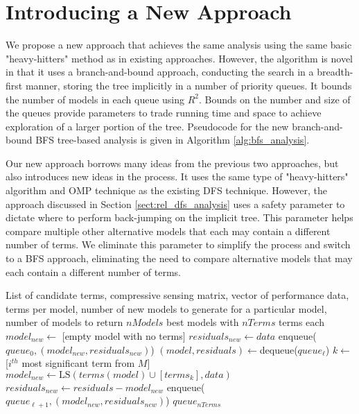 \section{Introducing a New Approach} \label{sect:approach}

We propose a new approach that achieves the same analysis using the same basic "heavy-hitters" method as in existing approaches.
However, the algorithm is novel in that it uses a branch-and-bound approach, conducting the search in a breadth-first manner, storing the tree implicitly in a number of priority queues.
It bounds the number of models in each queue using $R^2$.
Bounds on the number and size of the queues provide parameters to trade running time and space to achieve exploration of a larger portion of the tree. 
Pseudocode for the new branch-and-bound BFS tree-based analysis is given in Algorithm \ref{alg:bfs_analysis}.

Our new approach borrows many ideas from the previous two approaches, but also introduces new ideas in the process.
It uses the same type of "heavy-hitters" algorithm and OMP technique as the existing DFS technique.
However, the approach discussed in Section \ref{sect:rel_dfs_analysis} \cite{Compton-et-al-LA} uses a safety parameter to dictate where to perform back-jumping on the implicit tree.
This parameter helps compare multiple other alternative models that each may contain a different number of terms.
We eliminate this parameter to simplify the process and switch to a BFS approach, eliminating the need to compare alternative models that may each contain a different number of terms.

\begin{algorithm}[pthb]
\caption{$\mathrm{BFS\_Analysis}(\mathit{terms}, M, \mathit{data}, \mathit{nTerms}, \mathit{nNewModels}, \mathit{nModels})$}
\label{alg:bfs_analysis}

\begin{algorithmic}[1]
\REQUIRE List of candidate terms, compressive sensing matrix, vector of performance data, terms per model, number of new models to generate for a particular model, number of models to return
\ENSURE $\mathit{nModels}$ best models with $nTerms$ terms each
\STATE $model_{new} \gets$ [empty model with no terms]
\STATE $residuals_{new} \gets data$
\STATE enqueue($queue_{0},(model_{new},residuals_{new})$)
		\STATE $(model,residuals) \gets $dequeue($queue_{\ell}$)
			\STATE $k \gets$ [$i^{th}$ most significant term from $M$]
			\STATE $model_{new} \gets \mathrm{LS}(terms(model) \cup [terms_k],data)$
			\STATE $residuals_{new} \gets residuals - model_{new}$
			\STATE enqueue($queue_{\ell+1},(model_{new},residuals_{new})$)
		\ENDFOR
	\ENDWHILE
\ENDFOR
\RETURN $queue_{nTerms}$
\end{algorithmic}
\end{algorithm}

